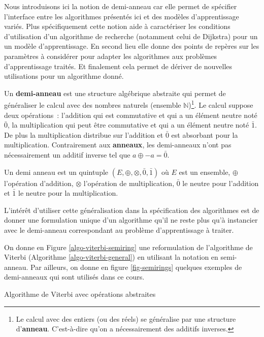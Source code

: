 \documentclass[11pt,openany]{book}
\newcommand{\kw}[1]{{\bf #1}} %
\begin{document}
Nous introduisons ici la notion de demi-anneau
car elle permet de spécifier l'interface entre les
algorithmes présentés ici et des
modèles d'apprentissage variés. 
Plus spécifiquement cette notion aide à caractériser
les conditions d'utilisation d'un algorithme de recherche (notamment
celui de Dijkstra) pour un
un modèle d'apprentissage. En second lieu elle donne des points de
repères sur les paramètres à considérer pour adapter les algorithmes
aux problèmes d'apprentissage traités. Et finalement cela permet de
dériver de nouvelles utilisations pour un algorithme donné.

Un \kw{demi-anneau} est une structure algébrique abstraite qui
permet de généraliser le calcul avec des nombres naturels (ensemble
$\mathbb{N}$)\footnote{Le calcul avec des entiers (ou des réels) se
  généralise par une structure d'\kw{anneau}. C'est-à-dire qu'on a
  nécessairement des
additifs inverses.}.
Le calcul suppose deux opérations~: l'addition qui est commutative et
qui a un élément neutre noté $\bar{0}$, la multiplication qui peut
être commutative et qui a un élément neutre noté
$\bar{1}$. De plus la multiplication distribue sur l'addition et
$\bar{0}$ est absorbant pour la multiplication.
Contrairement aux \kw{anneaux}, les demi-anneaux n'ont pas
nécessairement un additif inverse tel que $a \oplus -a = \bar{0}$.

Un demi anneau est un quintuple $(E,\oplus,\otimes,\bar{0},\bar{1})$
où $E$ est un ensemble, 
$\oplus$ l'opération d'addition, $\otimes$ l'opération de multiplication, $\bar{0}$ le neutre pour l'addition et
$\bar{1}$ le neutre pour la multiplication.  

L'intérêt d'utiliser cette généralisation dans la spécification des
algorithmes est de donner une formulation unique d'un algorithme qu'il
ne reste plus qu'à instancier avec le demi-anneau correspondant au
problème d'apprentissage à traiter. 

On donne en Figure \ref{algo-viterbi-semiring} une reformulation de
l'algorithme de Viterbi (Algorithme \ref{algo-viterbi-general}) en utilisant la notation
en semi-anneau. Par ailleurs, on donne en figure \ref{fig-semirings} quelques exemples de
demi-anneaux qui sont utilisés dans ce cours.


\begin{algorithm}[htbp]
\caption{\label{algo-viterbi-semiring}Algorithme de Viterbi avec
  opérations abstraites}
\end{algorithm}
\end{document}
